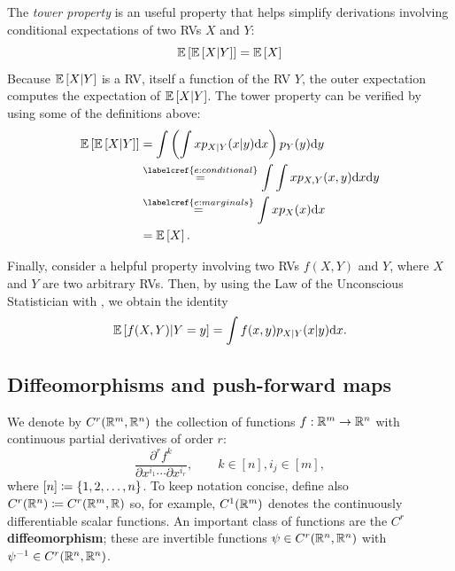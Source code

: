 \documentclass{fairmeta}
\newcommand{\highlight}[1]{{\color{metablue} \textbf{#1}}}
\renewcommand{\eqref}[1]{\labelcref{#1}}
\numberwithin{equation}{section}
\begin{document}
The \emph{tower property} is an useful property that helps simplify derivations involving conditional expectations of two RVs $X$ and $Y$:
\begin{equation}\label{e:tower}
    \E\brac{\E\brac{X|Y}} = \E\brac{X} %
\end{equation}
Because $\mathbb{E}\left [X|Y\right ]$ is a RV, itself a function of the RV $Y$, the outer expectation computes the expectation of $\mathbb{E}\left [X|Y\right ]$.
The tower property can be verified by using some of the definitions above: 
\begin{align*}
    \E\brac{\E\brac{X|Y}} &= \int \parr{\int x p_{X|Y}(x|y) \dd x} p_Y(y) \dd y \\
    &\overset{\eqref{e:conditional}}{=} \int \int x p_{X,Y}(x,y) \dd x\dd y \\
    &\overset{\eqref{e:marginals}}{=} \int x p_X(x)\dd x \\
    &= \E \brac{X}.
\end{align*}


Finally, consider a helpful property involving two RVs $f(X, Y)$ and $Y$, where $X$ and $Y$ are two arbitrary RVs.
Then, by using the Law of the Unconscious Statistician with \eqref{e:cond_E_func}, we obtain the identity
\begin{equation}\label{e:f_x_y_cond_y}
    \mathbb{E}\left [f(X,Y)|Y=y\right ] = \int f(x,y) p_{X|Y}(x|y) \mathrm{d} x.
\end{equation}


\subsection{Diffeomorphisms and push-forward maps}\label{ss:push-forward} 
We denote by $C^r(\mathbb R^m,\mathbb R^n)$ the collection of functions $f:\mathbb R^m\rightarrow\mathbb R^n$ with continuous partial derivatives of order $r$:
\begin{equation}
    \frac{\partial^r f^k}{\partial x^{i_1}\cdots \partial x^{i_r}}, \qquad k\in [n], i_j\in [m],    
\end{equation}
where $[n]\coloneqq\left\{1,2,\dots,n\right\}$.
To keep notation concise, define also $C^r(\mathbb R^n)\coloneqq C^r(\mathbb R^m,\mathbb R)$ so, for example, $C^1(\mathbb R^m)$ denotes the continuously differentiable scalar functions.
An important class of functions are the \highlight{$C^r$ diffeomorphism}; these are invertible functions $\psi\in C^r(\mathbb{R}^n,\mathbb{R}^n)$ with $\psi^{-1}\in C^r(\mathbb{R}^n,\mathbb{R}^n)$.
\end{document}
